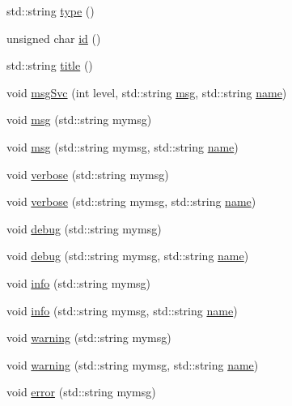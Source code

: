 \begin{DoxyCompactItemize}
\item 
std\+::string \hyperlink{classObject_a84f99f70f144a83e1582d1d0f84e4e62}{type} ()
\item 
unsigned char \hyperlink{classObject_af99145335cc61ff6e2798ea17db009d2}{id} ()
\item 
std\+::string \hyperlink{classObject_a73a0f1a41828fdd8303dd662446fb6c3}{title} ()
\item 
void \hyperlink{classObject_a3f9d5537ebce0c0f2bf6ae4d92426f3c}{msg\+Svc} (int level, std\+::string \hyperlink{classObject_a58b2d0618c2d08cf2383012611528d97}{msg}, std\+::string \hyperlink{classObject_a300f4c05dd468c7bb8b3c968868443c1}{name})
\item 
void \hyperlink{classObject_a58b2d0618c2d08cf2383012611528d97}{msg} (std\+::string mymsg)
\item 
void \hyperlink{classObject_ac5d59299273cee27aacf7de00d2e7034}{msg} (std\+::string mymsg, std\+::string \hyperlink{classObject_a300f4c05dd468c7bb8b3c968868443c1}{name})
\item 
void \hyperlink{classObject_a83d2db2df682907ea1115ad721c1c4a1}{verbose} (std\+::string mymsg)
\item 
void \hyperlink{classObject_a2d4120195317e2a3c6532e8bb9f3da68}{verbose} (std\+::string mymsg, std\+::string \hyperlink{classObject_a300f4c05dd468c7bb8b3c968868443c1}{name})
\item 
void \hyperlink{classObject_aac010553f022165573714b7014a15f0d}{debug} (std\+::string mymsg)
\item 
void \hyperlink{classObject_a6c9a0397ca804e04d675ed05683f5420}{debug} (std\+::string mymsg, std\+::string \hyperlink{classObject_a300f4c05dd468c7bb8b3c968868443c1}{name})
\item 
void \hyperlink{classObject_a644fd329ea4cb85f54fa6846484b84a8}{info} (std\+::string mymsg)
\item 
void \hyperlink{classObject_a1ca123253dfd30fc28b156f521dcbdae}{info} (std\+::string mymsg, std\+::string \hyperlink{classObject_a300f4c05dd468c7bb8b3c968868443c1}{name})
\item 
void \hyperlink{classObject_a65cd4fda577711660821fd2cd5a3b4c9}{warning} (std\+::string mymsg)
\item 
void \hyperlink{classObject_a11f101db4dd73d9391b0231818881d86}{warning} (std\+::string mymsg, std\+::string \hyperlink{classObject_a300f4c05dd468c7bb8b3c968868443c1}{name})
\item 
void \hyperlink{classObject_a204a95f57818c0f811933917a30eff45}{error} (std\+::string mymsg)
\item 

\end{DoxyCompactItemize}
